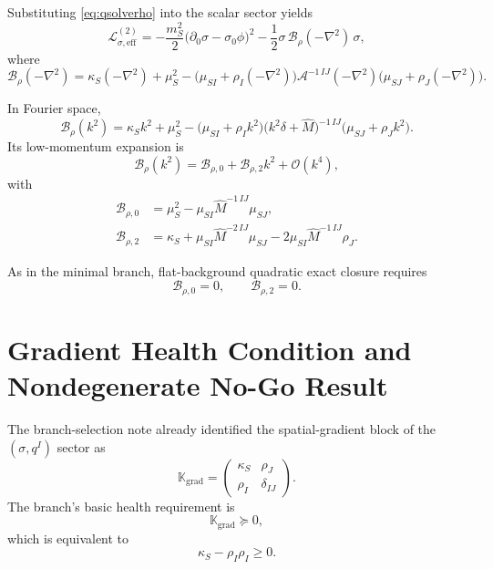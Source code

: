\documentclass[11pt]{article}
\begin{document}
Substituting \eqref{eq:qsolverho} into the scalar sector yields
\begin{equation}
\mathcal L_{\sigma,\mathrm{eff}}^{(2)}
=
-\frac{m_S^2}{2}\bigl(\partial_0\sigma-\sigma_0\phi\bigr)^2
-\frac{1}{2}\sigma\,\mathcal B_{\rho}(-\nabla^2)\,\sigma,
\label{eq:Lsigmaeffrho}
\end{equation}
where
\begin{equation}
\mathcal B_{\rho}(-\nabla^2)
=
\kappa_S(-\nabla^2)
+\mu_S^2
-\bigl(\mu_{SI}+\rho_I(-\nabla^2)\bigr)
\mathcal A^{-1\,IJ}(-\nabla^2)
\bigl(\mu_{SJ}+\rho_J(-\nabla^2)\bigr).
\label{eq:Brhooperator}
\end{equation}

In Fourier space,
\begin{equation}
\mathcal B_{\rho}(k^2)
=
\kappa_Sk^2+\mu_S^2
-\bigl(\mu_{SI}+\rho_Ik^2\bigr)
\bigl(k^2\delta+\widehat M\bigr)^{-1\,IJ}
\bigl(\mu_{SJ}+\rho_Jk^2\bigr).
\label{eq:Brhok}
\end{equation}
Its low-momentum expansion is
\begin{equation}
\mathcal B_{\rho}(k^2)
=
\mathcal B_{\rho,0}
+\mathcal B_{\rho,2}k^2
+\mathcal O(k^4),
\label{eq:Brhoexpand}
\end{equation}
with
\begin{align}
\mathcal B_{\rho,0}
&=
\mu_S^2-\mu_{SI}\widehat M^{-1\,IJ}\mu_{SJ},
\label{eq:Brho0}
\\
\mathcal B_{\rho,2}
&=
\kappa_S
+\mu_{SI}\widehat M^{-2\,IJ}\mu_{SJ}
-2\mu_{SI}\widehat M^{-1\,IJ}\rho_J.
\label{eq:Brho2}
\end{align}

As in the minimal branch, flat-background quadratic exact closure requires
\begin{equation}
\mathcal B_{\rho,0}=0,
\qquad
\mathcal B_{\rho,2}=0.
\label{eq:Brhoconditions}
\end{equation}

\section{Gradient Health Condition and Nondegenerate No-Go Result}

The branch-selection note already identified the spatial-gradient block of the \((\sigma,q^I)\) sector as
\begin{equation}
\mathbb K_{\mathrm{grad}}
=
\begin{pmatrix}
\kappa_S & \rho_J \\
\rho_I & \delta_{IJ}
\end{pmatrix}.
\label{eq:Kgrad}
\end{equation}
The branch's basic health requirement is
\begin{equation}
\mathbb K_{\mathrm{grad}}\succeq 0,
\label{eq:Kpositive}
\end{equation}
which is equivalent to
\begin{equation}
\kappa_S-\rho_I\rho_I \ge 0.
\label{eq:Schur}
\end{equation}
\end{document}
